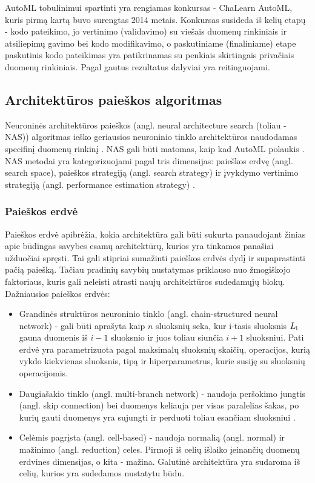\documentclass{VUMIFPSbakalaurinis}
\begin{document}
AutoML tobulinimui spartinti yra rengiamas konkursas - ChaLearn AutoML, kuris pirmą kartą buvo surengtas 2014 metais. Konkursas susideda iš kelių etapų - kodo pateikimo, jo vertinimo (validavimo) su viešais duomenų rinkiniais ir atsiliepimų gavimo bei kodo modifikavimo, o paskutiniame (finaliniame) etape paskutinis kodo pateikimas yra patikrinamas su penkiais skirtingais privačiais duomenų rinkiniais. Pagal gautus rezultatus dalyviai yra reitinguojami.

\subsection{Architektūros paieškos algoritmas}

Neuroninės architektūros paieškos (angl. neural architecture search (toliau - NAS)) algoritmas ieško geriausios neuroninio tinklo architektūros naudodamas specifinį duomenų rinkinį \cite{8676019}. 
NAS gali būti matomas, kaip kad AutoML polaukis \cite{14f00e7a0861477a81f65b5c51f660f4}. 
NAS metodai yra kategorizuojami pagal tris dimensijas: paieškos erdvę (angl. search space), paieškos strategiją (angl. search strategy) ir įvykdymo vertinimo strategiją (angl. performance estimation strategy) \cite{elsken2018neural}.

\subsubsection{Paieškos erdvė}

Paieškos erdvė apibrėžia, kokia architektūra gali būti sukurta panaudojant žinias apie būdingas savybes esamų architektūrų, kurios yra tinkamos panašiai užduočiai spręsti. Tai gali stipriai sumažinti paieškos erdvės dydį ir supaprastinti pačią paiešką. 
Tačiau pradinių savybių nustatymas priklauso nuo žmogiškojo faktoriaus, kuris gali neleisti atrasti naujų architektūros sudedamųjų blokų.
Dažniausios paieškos erdvės:
\begin{itemize}
    \item Grandinės struktūros neuroninio tinklo (angl. chain-structured neural network) - gali būti aprašyta kaip \(n\) sluoksnių seka, kur i-tasis sluoksnis \(L\textsubscript{i}\) gauna duomenis iš \(i-1\) sluoksnio ir juos toliau siunčia \(i+1\) sluoksniui. Pati erdvė yra parametrizuota pagal maksimalų sluoksnių skaičių, operacijos, kurią vykdo kiekvienas sluoksnis, tipą ir hiperparametrus, kurie susiję su sluoksnių operacijomis.
    \item Daugiašakio tinklo (angl. multi-branch network) - naudoja peršokimo jungtis (angl. skip connection) bei duomenys keliauja per visas paralelias šakas, po kurių gauti duomenys yra sujungti ir perduoti toliau esančiam sluoksniui \cite{DBLP:journals/corr/abs-1709-09582}. 
    \item Celėmis pagrįsta (angl. cell-based) - naudoja normalią (angl. normal) ir mažinimo (angl. reduction) celes. Pirmoji iš celių išlaiko įeinančių duomenų erdvines dimensijas, o kita - mažina. Galutinė architektūra yra sudaroma iš celių, kurios yra sudedamos nustatytu būdu.
\end{itemize}
\end{document}
